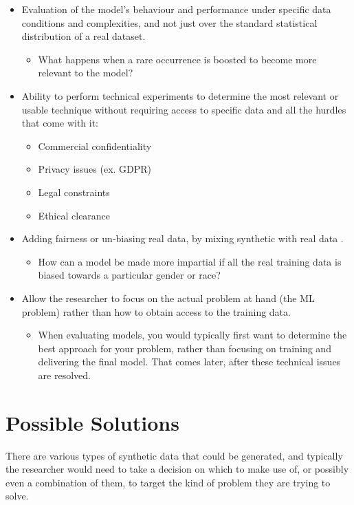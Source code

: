 \begin{itemize}
    \item Evaluation of the model's behaviour and performance under specific data conditions and complexities, and not just over the standard statistical distribution of a real dataset.
    \begin{itemize}
        \item What happens when a rare occurrence is boosted to become more relevant to the model?
    \end{itemize}
    \item Ability to perform technical experiments to determine the most relevant or usable technique without requiring access to specific data and all the hurdles that come with it:
    \begin{itemize}
        \item Commercial confidentiality
        \item Privacy issues (ex. GDPR)
        \item Legal constraints
        \item Ethical clearance
    \end{itemize}
    \item Adding fairness or un-biasing real data, by mixing synthetic with real data \citep{pedreschi2008,zafar2015}.
    \begin{itemize}
        \item How can a model be made more impartial if all the real training data is biased towards a particular gender or race?
    \end{itemize}
    \item Allow the researcher to focus on the actual problem at hand (the ML problem) rather than how to obtain access to the training data.
    \begin{itemize}
        \item When evaluating models, you would typically first want to determine the best approach for your problem, rather than focusing on training and delivering the final model. That comes later, after these technical issues are resolved.
    \end{itemize}
\end{itemize}

\section{Possible Solutions}

There are various types of synthetic data that could be generated, and typically the researcher would need to take a decision on which to make use of, or possibly even a combination of them, to target the kind of problem they are trying to solve.

